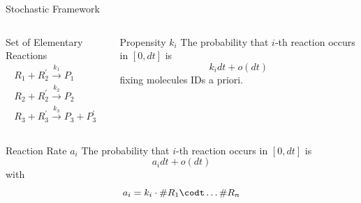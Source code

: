 \documentclass{beamer}
\begin{document}
\begin{frame}{Stochastic Framework}
  \begin{columns}
    \begin{column}{.45 \textwidth}
     \begin{block}{Set of Elementary Reactions}
      \begin{equation*}
        \begin{gathered}
          R_1 + R^\prime_2 \xrightarrow{k_1} P_1 \\
          R_2 + R^\prime_2 \xrightarrow{k_2} P_2 \\
          R_3 + R_3^\prime \xrightarrow{k_3} P_3 + P_3^\prime 
         \end{gathered}
      \end{equation*}
    \end{block}
    \end{column} 
    \begin{column}{.45 \textwidth}
      \begin{block}{Propensity $k_i$}
        The probability that $i$-th reaction occurs
         in  $[0, dt]$ is
         $$k_i dt + o(dt)$$
         fixing molecules IDs a priori.
       \end{block}
    \end{column}
  \end{columns}
  \begin{block}{Reaction Rate $a_i$}
         The probability that $i$-th reaction occurs
         in  $[0, dt]$ is
         $$a_i dt + o(dt)$$
         with
         $$ a_i = k_i \cdot \#R_1 \codt \dots \#R_n$$
  \end{block}
\end{frame}
\end{document}
